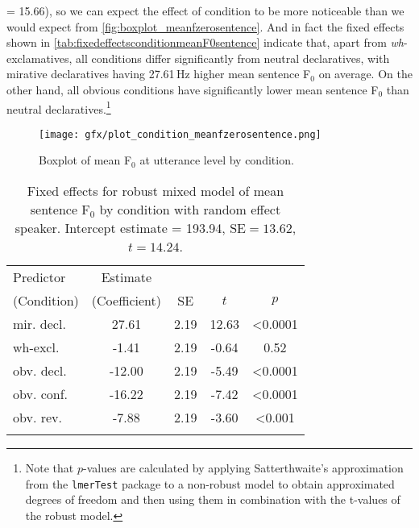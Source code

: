 = 15.66), so we can expect the effect of condition to be more noticeable than we would expect from \autoref{fig:boxplot_meanfzerosentence}. And in fact the fixed effects shown in \autoref{tab:fixedeffectsconditionmeanF0sentence} indicate that, apart from \textit{wh}-exclamatives, all conditions differ significantly from neutral declaratives, with mirative declaratives having 27.61\,Hz higher mean sentence F$_0$ on average. On the other hand, all obvious conditions have significantly lower mean sentence F$_0$ than neutral declaratives.\footnote{Note that $p$-values are calculated by applying Satterthwaite's approximation from the \texttt{lmerTest} package \citep{KuznetsovaETAL.2017} to a non-robust model to obtain approximated degrees of freedom and then using them in combination with the t-values of the robust model.}

\begin{figure}
	\texttt{[image: gfx/plot\_condition\_meanfzerosentence.png]}
	\caption[Boxplot of mean F$_0$ at utterance level by condition]{Boxplot of mean F$_0$ at utterance level by condition.}\label{fig:boxplot_meanfzerosentence}
\end{figure}

\begin{table}
	\begin{tabular}{l S[table-format=-2.2] S[table-format=1.2] S[table-format=-1.2] S[table-format=<1.5]}
	\lsptoprule
		{Predictor}  & {Estimate}        &  &  & \\
		{(Condition)}  & {(Coefficient)} & {SE} & {$t$} & {$p$}\\
	\midrule
		mir. decl. & 27.61 & 2.19 & 12.63 & <0.0001 \\
		wh-excl.   & -1.41 & 2.19 & -0.64 & 0.52 \\
		obv. decl. & -12.00 & 2.19 & -5.49 & <0.0001\\
		obv. conf. & -16.22 & 2.19 & -7.42 & <0.0001\\
		obv. rev.  & -7.88 & 2.19 & -3.60 & <0.001\\
	\lspbottomrule
	\end{tabular}
	\caption[Fixed effects for robust mixed model of mean sentence F$_0$ by condition with random effect speaker]{Fixed effects for robust mixed model of mean sentence F$_0$ by condition with random effect speaker. Intercept estimate = 193.94, $\text{SE} = 13.62$, $t = 14.24$.}
	\label{tab:fixedeffectsconditionmeanF0sentence}
\end{table}


